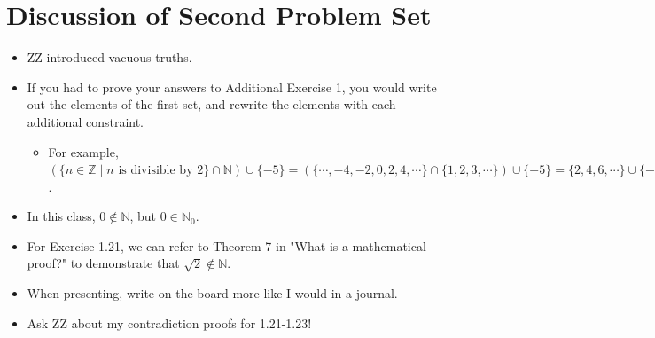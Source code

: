 \documentclass[titlepage]{article}
\theoremstyle{definition}
\newcommand{\N}{\mathbb{N}}
\newcommand{\Z}{\mathbb{Z}}
\begin{document}
\section{Discussion of Second Problem Set}
\begin{itemize}
    \item {}ZZ introduced vacuous truths.
    \item If you had to prove your answers to Additional Exercise 1, you would write out the elements of the first set, and rewrite the elements with each additional constraint.
    \begin{itemize}
        \item For example, $(\{n\in\Z\mid n\text{ is divisible by }2\}\cap\N)\cup\{-5\}=(\{\cdots,-4,-2,0,2,4,\cdots\}\cap\{1,2,3,\cdots\})\cup\{-5\}=\{2,4,6,\cdots\}\cup\{-5\}$.
    \end{itemize}
    \item In this class, $0\notin\N$, but $0\in\N_0$.
    \item For Exercise 1.21, we can refer to Theorem 7 in "What is a mathematical proof?" to demonstrate that $\sqrt{2}\notin\N$.
    \item When presenting, write on the board more like I would in a journal.
    \item Ask ZZ about my contradiction proofs for 1.21-1.23!
\end{itemize}
\newpage
\end{document}
